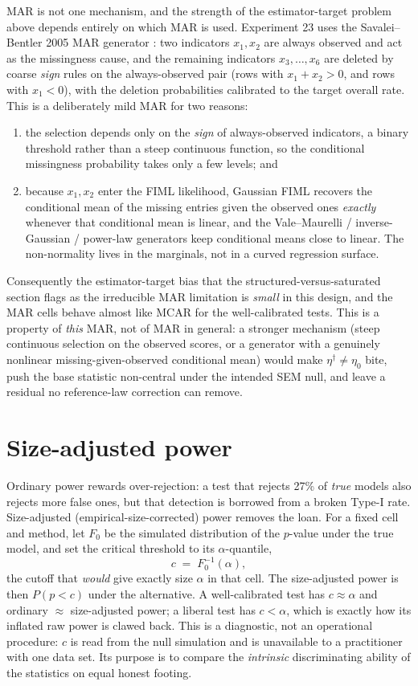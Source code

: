 \documentclass[11pt]{article}
\begin{document}
MAR is not one mechanism, and the strength of the estimator-target problem
above depends entirely on which MAR is used. Experiment 23 uses the
Savalei--Bentler 2005 MAR generator \cite{savalei2010}: two indicators
\(x_1,x_2\) are always observed and act as the missingness cause, and the
remaining indicators \(x_3,\ldots,x_6\) are deleted by coarse \emph{sign}
rules on the always-observed pair (rows with \(x_1+x_2>0\), and rows with
\(x_1<0\)), with the deletion probabilities calibrated to the target overall
rate. This is a deliberately mild MAR for two reasons:
\begin{enumerate}
  \item the selection depends only on the \emph{sign} of always-observed
        indicators, a binary threshold rather than a steep continuous
        function, so the conditional missingness probability takes only a
        few levels; and
  \item because \(x_1,x_2\) enter the FIML likelihood, Gaussian FIML recovers
        the conditional mean of the missing entries given the observed ones
        \emph{exactly} whenever that conditional mean is linear, and the
        Vale--Maurelli / inverse-Gaussian / power-law generators keep
        conditional means close to linear. The non-normality lives in the
        marginals, not in a curved regression surface.
\end{enumerate}
Consequently the estimator-target bias that the structured-versus-saturated
section flags as the irreducible MAR limitation is \emph{small} in this design,
and the MAR cells behave almost like MCAR for the well-calibrated tests. This
is a property of \emph{this} MAR, not of MAR in general: a stronger mechanism
(steep continuous selection on the observed scores, or a generator with a
genuinely nonlinear missing-given-observed conditional mean) would make
\(\eta^\dagger \ne \eta_0\) bite, push the base statistic non-central under the
intended SEM null, and leave a residual no reference-law correction can remove.

\section*{Size-adjusted power}

Ordinary power rewards over-rejection: a test that rejects 27\% of \emph{true}
models also rejects more false ones, but that detection is borrowed from a
broken Type-I rate. Size-adjusted (empirical-size-corrected) power removes the
loan. For a fixed cell and method, let \(F_0\) be the simulated distribution of
the \(p\)-value under the true model, and set the critical threshold to its
\(\alpha\)-quantile,
\[
  c \;=\; F_0^{-1}(\alpha),
\]
the cutoff that \emph{would} give exactly size \(\alpha\) in that cell. The
size-adjusted power is then \(P(p<c)\) under the alternative. A well-calibrated
test has \(c\approx\alpha\) and ordinary \(\approx\) size-adjusted power; a
liberal test has \(c<\alpha\), which is exactly how its inflated raw power is
clawed back. This is a diagnostic, not an operational procedure: \(c\) is read
from the null simulation and is unavailable to a practitioner with one data
set. Its purpose is to compare the \emph{intrinsic} discriminating ability of
the statistics on equal honest footing.
\end{document}

